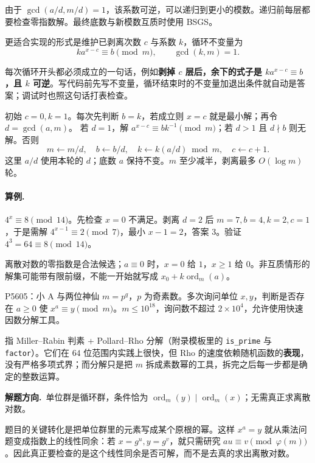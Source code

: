 \documentclass[UTF8,a4paper,11pt,twoside,openright,fontset=fandol]{ctexbook}
\theoremstyle{definition}
\newcommand{\ord}{\operatorname{ord}}
\newcommand{\hint}{\par\noindent\textbf{解题方向.}\ }
\begin{document}
由于 $\gcd(a/d,m/d)=1$，该系数可逆，可以递归到更小的模数。递归前每层都要检查零指数解。最终底数与新模数互质时使用 BSGS。


更适合实现的形式是维护已剥离次数 $c$ 与系数 $k$，循环不变量为
\[
 k a^{x-c}\equiv b\pmod m,\qquad\gcd(k,m)=1.
\]

\begin{tip}
每次循环开头都必须成立的一句话，例如\textbf{剥掉 $c$ 层后，余下的式子是 $ka^{x-c}\equiv b$，且 $k$ 可逆}。写代码前先写不变量，循环结束时的不变量加退出条件就自动是答案；调试时也照这句话打表检查。
\end{tip}

初始 $c=0,k=1$。每次先判断 $b=k$，若成立则 $x=c$ 就是最小解；再令 $d=\gcd(a,m)$。
若 $d=1$，解 $a^{x-c}\equiv bk^{-1}\pmod m$；若 $d>1$ 且 $d\nmid b$ 则无解。否则
\[
 m\gets m/d,\quad b\gets b/d,\quad
 k\gets k(a/d)\bmod m,\quad c\gets c+1.
\]
这里 $a/d$ 使用本轮的 $d$；底数 $a$ 保持不变。$m$ 至少减半，剥离最多 $O(\log m)$ 轮。

\paragraph{算例.} $4^x\equiv8\pmod{14}$。先检查 $x=0$ 不满足。剥离 $d=2$ 后 $m=7,b=4,k=2,c=1$，于是需解 $4^{x-1}\equiv2\pmod7$，最小 $x-1=2$，答案 $3$。验证 $4^3=64\equiv8\pmod{14}$。
\begin{pitfall}
离散对数的零指数是合法候选；$a\equiv0$ 时，$x=0$ 给 $1$，$x\ge1$ 给 $0$。非互质情形的解集可能带有限前缀，不能一开始就写成 $x_0+k\ord_m(a)$。
\end{pitfall}


\begin{problem}{P5605：小 A 与两位神仙}
$m=p^q$，$p$ 为奇素数。多次询问单位 $x,y$，判断是否存在 $a\ge0$ 使 $x^a\equiv y\pmod m$。$m\le10^{18}$，询问数不超过 $2\times10^4$，允许使用快速因数分解工具。
\end{problem}

\begin{tip}
指 Miller--Rabin 判素 + Pollard--Rho 分解（附录模板里的 \texttt{is\_prime} 与 \texttt{factor}）。它们在 $64$ 位范围内实践上很快，但 Rho 的速度依赖随机函数的\textbf{表现}，没有严格多项式界；而分解只是把 $m$ 拆成素数幂的工具，拆完之后每一步都是确定的整数运算。
\end{tip}

\hint 单位群是循环群，条件恰为 $\ord_m(y)\mid\ord_m(x)$；无需真正求离散对数。

\begin{pitfall}[讲解：先看这题到底在做什么]
题目的关键转化是把单位群里的元素写成某个原根的幂。这样 $x^a=y$ 就从乘法问题变成指数上的线性同余：若 $x=g^u,y=g^v$，就只需研究 $au\equiv v\pmod{\varphi(m)}$。因此真正要检查的是这个线性同余是否可解，而不是去真的求出离散对数。
\end{pitfall}
\end{document}
